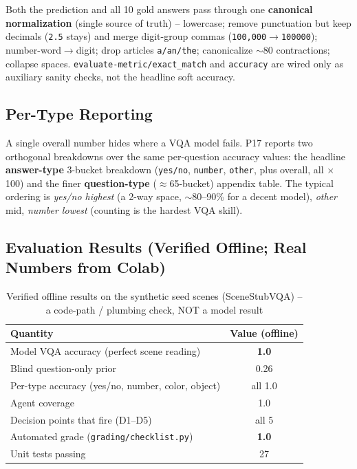 \documentclass[12pt,a4paper]{article}
\begin{document}
Both the prediction and all 10 gold answers pass through one \textbf{canonical normalization} (single source of truth) -- lowercase; remove punctuation but keep decimals (\texttt{2.5} stays) and merge digit-group commas (\texttt{100,000}$\rightarrow$\texttt{100000}); number-word$\rightarrow$digit; drop articles \texttt{a/an/the}; canonicalize $\sim$80 contractions; collapse spaces. \texttt{evaluate-metric/exact\_match} and \texttt{accuracy} are wired only as auxiliary sanity checks, not the headline soft accuracy.

\subsection{Per-Type Reporting}

A single overall number hides where a VQA model fails. P17 reports two orthogonal breakdowns over the same per-question accuracy values: the headline \textbf{answer-type} 3-bucket breakdown (\texttt{yes/no}, \texttt{number}, \texttt{other}, plus overall, all $\times$100) and the finer \textbf{question-type} ($\approx$65-bucket) appendix table. The typical ordering is \emph{yes/no highest} (a 2-way space, $\sim$80--90\% for a decent model), \emph{other} mid, \emph{number lowest} (counting is the hardest VQA skill).

\subsection{Evaluation Results (Verified Offline; Real Numbers from Colab)}

\begin{table}[H]
\centering
\caption{Verified offline results on the synthetic seed scenes (SceneStubVQA) -- a code-path / plumbing check, NOT a model result}
\begin{tabular}{lc}
\toprule
\textbf{Quantity} & \textbf{Value (offline)} \\
\midrule
Model VQA accuracy (perfect scene reading) & \textbf{1.0} \\
Blind question-only prior & 0.26 \\
Per-type accuracy (yes/no, number, color, object) & all 1.0 \\
Agent coverage & 1.0 \\
Decision points that fire (D1--D5) & all 5 \\
Automated grade (\texttt{grading/checklist.py}) & \textbf{1.0} \\
Unit tests passing & 27 \\
\bottomrule
\end{tabular}
\end{table}
\end{document}
